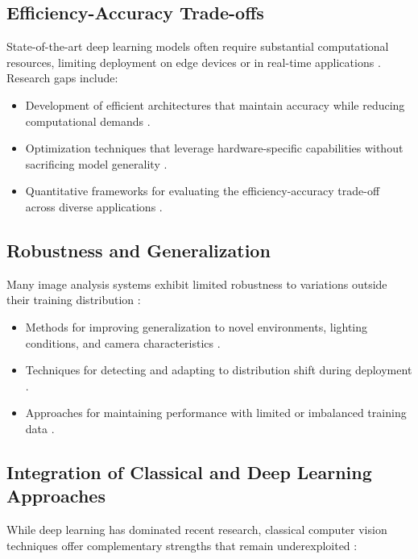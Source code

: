 \subsection{Efficiency-Accuracy Trade-offs}
State-of-the-art deep learning models often require substantial computational resources, limiting deployment on edge devices or in real-time applications \cite{canziani2016analysis}. Research gaps include:

\begin{itemize}
    \item Development of efficient architectures that maintain accuracy while reducing computational demands \cite{howard2017mobilenets}.
    
    \item Optimization techniques that leverage hardware-specific capabilities without sacrificing model generality \cite{han2016eie}.
    
    \item Quantitative frameworks for evaluating the efficiency-accuracy trade-off across diverse applications \cite{huang2017speed}.
\end{itemize}

\subsection{Robustness and Generalization}
Many image analysis systems exhibit limited robustness to variations outside their training distribution \cite{hendrycks2019benchmarking}:

\begin{itemize}
    \item Methods for improving generalization to novel environments, lighting conditions, and camera characteristics \cite{sun2019improving}.
    
    \item Techniques for detecting and adapting to distribution shift during deployment \cite{li2017deeper}.
    
    \item Approaches for maintaining performance with limited or imbalanced training data \cite{wang2017learning}.
\end{itemize}

\subsection{Integration of Classical and Deep Learning Approaches}
While deep learning has dominated recent research, classical computer vision techniques offer complementary strengths that remain underexploited \cite{voulodimos2018deep}:

